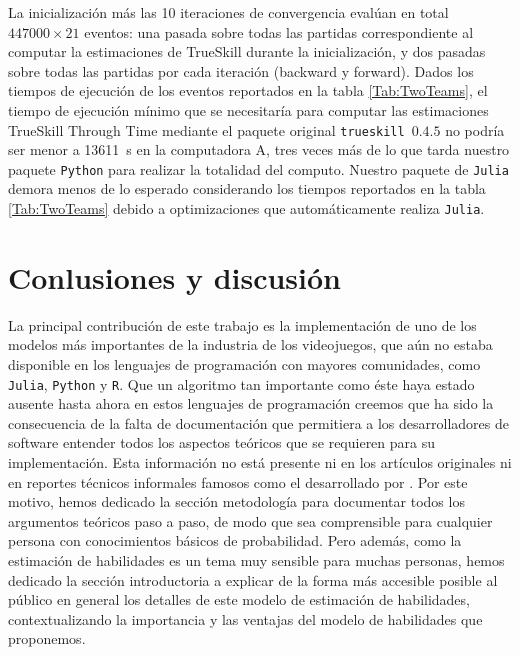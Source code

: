 \documentclass[a4paper,11pt]{book}
\theoremstyle{definition}
\newif\ifen
\newcommand{\en}[1]{\ifen#1\fi}
\begin{document}
%
La inicializaci\'on m\'as las 10 iteraciones de convergencia eval\'uan en total $447000\times 21$ eventos: una pasada sobre todas las partidas correspondiente al computar la estimaciones de TrueSkill durante la inicializaci\'on, y dos pasadas sobre todas las partidas por cada iteraci\'on (backward y forward).
%
Dados los tiempos de ejecuci\'on de los eventos reportados en la tabla \ref{Tab:TwoTeams}, el tiempo de ejecuci\'on m\'inimo que se necesitar\'ia para computar las estimaciones TrueSkill Through Time mediante el paquete original \texttt{trueskill}~$0.4.5$ no podr\'ia ser menor a \SI{13611}{\s} en la computadora A, tres veces m\'as de lo que tarda nuestro paquete \texttt{Python} para realizar la totalidad del computo.
%
Nuestro paquete de \texttt{Julia} demora menos de lo esperado considerando los tiempos reportados en la tabla \ref{Tab:TwoTeams} debido a optimizaciones que autom\'aticamente realiza \texttt{Julia}.
%




\section{Conlusiones y discusi\'on} \label{sec:summary}


La principal contribuci\'on de este trabajo es la implementaci\'on de uno de los modelos m\'as importantes de la industria de los videojuegos, que a\'un no estaba disponible en los lenguajes de programaci\'on con mayores comunidades, como \texttt{Julia}, \texttt{Python} y \texttt{R}.
%
Que un algoritmo tan importante como \'este haya estado ausente hasta ahora en estos lenguajes de programaci\'on creemos que ha sido la consecuencia de la falta de documentaci\'on que permitiera a los desarrolladores de software entender todos los aspectos te\'oricos que se requieren para su implementaci\'on.
%
Esta informaci\'on no est\'a presente ni en los art\'iculos originales \cite{Herbrich2007, Dangauthier2007} ni en reportes t\'ecnicos informales famosos como el desarrollado por \cite{Mosser2011}.
%
Por este motivo, hemos dedicado la secci\'on metodolog\'ia para documentar todos los argumentos te\'oricos paso a paso, de modo que sea comprensible para cualquier persona con conocimientos b\'asicos de probabilidad.
%
Pero adem\'as, como la estimaci\'on de habilidades es un tema muy sensible para muchas personas, hemos dedicado la secci\'on introductoria a explicar de la forma m\'as accesible posible al p\'ublico en general los detalles de este modelo de estimaci\'on de habilidades, contextualizando la importancia y las ventajas del modelo de habilidades que proponemos.
\end{document}
